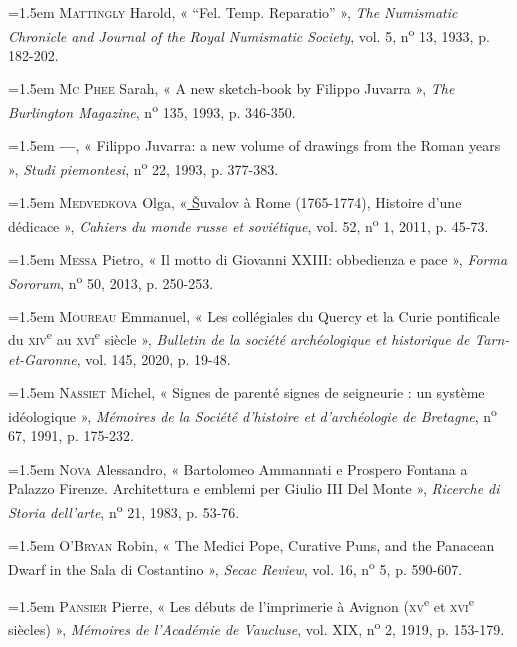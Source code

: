 \documentclass[12pt,twoside,openany]{book}
\newenvironment{PurhBibliography}
  {%
    \par
    \setlength{\parindent}{0pt}%
    \setlength{\leftskip}{0pt}%
  }
  {%
    \par
  }
\begin{document}
\begin{PurhBibliography}
\noindent\hangindent=1.5em \textsc{Mattingly} Harold, « “Fel. Temp. Reparatio” », \textit{The Numismatic Chronicle and Journal of the Royal Numismatic Society}, vol. 5, n\textsuperscript{o} 13, 1933, p. 182-202.\par
\noindent\hangindent=1.5em \textsc{Mc Phee} Sarah, « A new sketch-book by Filippo Juvarra », \textit{The Burlington Magazine}, n\textsuperscript{o} 135, 1993, p. 346-350.\par
\noindent\hangindent=1.5em \textbf{—}, « Filippo Juvarra: a new volume of drawings from the Roman years », \textit{Studi piemontesi}, n\textsuperscript{o} 22, 1993, p. 377-383.\par
\noindent\hangindent=1.5em \textsc{Medvedkova} Olga, «\href{https://fr.wikipedia.org/wiki/Š}{ Š}uvalov à Rome (1765-1774), Histoire d’une dédicace », \textit{Cahiers du monde russe et soviétique}, vol. 52, n\textsuperscript{o} 1, 2011, p. 45-73.\par
\noindent\hangindent=1.5em \textsc{Messa} Pietro, « Il motto di Giovanni XXIII: obbedienza e pace », \textit{Forma Sororum}, n\textsuperscript{o} 50, 2013, p. 250-253.\par
\noindent\hangindent=1.5em \textsc{Moureau} Emmanuel, « Les collégiales du Quercy et la Curie pontificale du \textsc{xiv}\textsuperscript{e} au \textsc{xvi}\textsuperscript{e} siècle », \textit{Bulletin de la société archéologique et historique de Tarn-et-Garonne}, vol. 145, 2020, p. 19-48.\par
\noindent\hangindent=1.5em \textsc{Nassiet} Michel, « Signes de parenté signes de seigneurie : un système idéologique », \textit{Mémoires de la Société d’histoire et d’archéologie de Bretagne}, n\textsuperscript{o} 67, 1991, p. 175-232.\par
\noindent\hangindent=1.5em \textsc{Nova} Alessandro, « Bartolomeo Ammannati e Prospero Fontana a Palazzo Firenze. Architettura e emblemi per Giulio \textsc{III} Del Monte », \textit{Ricerche di Storia dell’arte}, n\textsuperscript{o} 21, 1983, p. 53-76.\par
\noindent\hangindent=1.5em \textsc{O’Bryan} Robin, « The Medici Pope, Curative Puns, and the Panacean Dwarf in the Sala di Costantino », \textit{Secac Review}, vol. 16, n\textsuperscript{o} 5, p. 590-607.\par
\noindent\hangindent=1.5em \textsc{Pansier} Pierre, « Les débuts de l’imprimerie à Avignon (\textsc{xv}\textsuperscript{e} et \textsc{xvi}\textsuperscript{e} siècles) », \textit{Mémoires de l’Académie de Vaucluse}, vol. XIX, n\textsuperscript{o} 2, 1919, p. 153-179.\par

\end{PurhBibliography}
\end{document}
